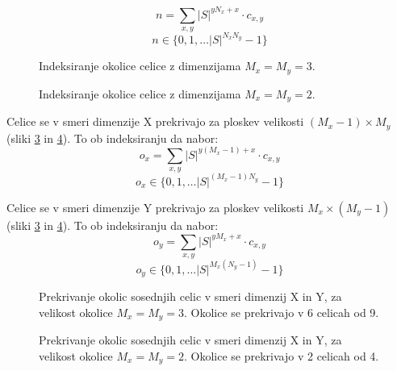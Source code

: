 \documentclass[12pt,a4paper,openany,twoside]{book}
\begin{document}
\begin{equation}
n = \sum_{x,y} |S|^{y N_x + x} \cdot c_{x,y}
\end{equation}
\begin{equation}
n \in \{0, 1, \dots |S|^{N_x N_y}-1\}
\end{equation}

\begin{figure}[htb]
\centerline{}
\caption[Indeksiranje okolice \(3 \times 3\).]{Indeksiranje okolice celice z dimenzijama \(M_x=M_y=3\).}
\label{neighborhood_index_moore}
\end{figure}

\begin{figure}[htb]
\centerline{}
\caption[Indeksiranje okolice \(2 \times 2\).]{Indeksiranje okolice celice z dimenzijama \(M_x=M_y=2\).}
\label{neighborhood_index_quad}
\end{figure}

Celice se v smeri dimenzije X prekrivajo za ploskev velikosti \((M_x-1) \times M_y\) (sliki \ref{overlap_dimension_moore} in \ref{overlap_dimension_quad}).
To ob indeksiranju da nabor:
\begin{equation}
o_x = \sum_{x,y} |S|^{y (M_x-1) + x} \cdot c_{x,y}
\end{equation}
\begin{equation}
o_x \in \{0, 1, \dots |S|^{(M_x-1)N_y}-1\}
\end{equation}

Celice se v smeri dimenzije Y prekrivajo za ploskev velikosti \(M_x \times (M_y-1)\) (sliki \ref{overlap_dimension_moore} in \ref{overlap_dimension_quad}).
To ob indeksiranju da nabor:
\begin{equation}
o_y = \sum_{x,y} |S|^{y M_x + x} \cdot c_{x,y}
\end{equation}
\begin{equation}
o_y \in \{0, 1, \dots |S|^{M_x(N_y-1)}-1\}
\end{equation}

\begin{figure}[htb]
\centerline{}
\caption[Prekrivaje okolic \(3 \times 3\) v smeri dimenzij X in Y.]
{Prekrivanje okolic sosednjih celic v smeri dimenzij X in Y, za velikost okolice \(M_x=M_y=3\).
Okolice se prekrivajo v 6 celicah od 9.}
\label{overlap_dimension_moore}
\end{figure}

\begin{figure}[htb]
\centerline{}
\caption[Prekrivaje okolic \(2 \times 2\) v smeri dimenzij X in Y.]
{Prekrivanje okolic sosednjih celic v smeri dimenzij X in Y, za velikost okolice \(M_x=M_y=2\).
Okolice se prekrivajo v 2 celicah od 4.}
\label{overlap_dimension_quad}
\end{figure}
\end{document}
